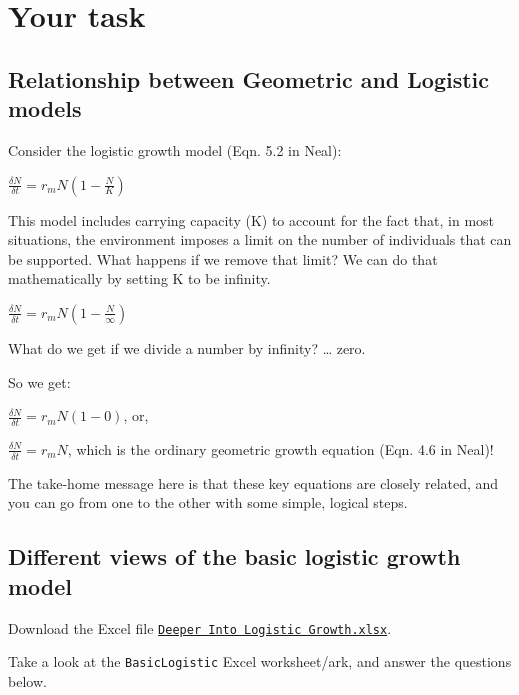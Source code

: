 \documentclass[
  a4paper]{book}
\begin{document}
\hypertarget{your-task-4}{%
\section{Your task}\label{your-task-4}}

\hypertarget{relationship-between-geometric-and-logistic-models}{%
\subsection{Relationship between Geometric and Logistic models}\label{relationship-between-geometric-and-logistic-models}}

Consider the logistic growth model (Eqn. 5.2 in Neal):

\(\frac{\delta N}{\delta t}=r_m N\left(1-\frac{N}{K}\right)\)

This model includes carrying capacity (K) to account for the fact that, in most situations, the environment imposes a limit on the number of individuals that can be supported. What happens if we remove that limit? We can do that mathematically by setting K to be infinity.

\(\frac{\delta N}{\delta t}=r_m N\left(1-\frac{N}{\infty}\right)\)

What do we get if we divide a number by infinity? \ldots{} zero.

So we get:

\(\frac{\delta N}{\delta t}=r_m N\left(1-0\right)\), or,

\(\frac{\delta N}{\delta t}=r_m N\), which is the ordinary geometric growth equation (Eqn. 4.6 in Neal)!

The take-home message here is that these key equations are closely related, and you can go from one to the other with some simple, logical steps.

\hypertarget{different-views-of-the-basic-logistic-growth-model}{%
\subsection{Different views of the basic logistic growth model}\label{different-views-of-the-basic-logistic-growth-model}}

Download the Excel file \href{https://www.dropbox.com/s/4xq399z7skl1akv/Deeper\%20into\%20Logistic\%20Growth.xlsx?dl=1}{\texttt{Deeper\ Into\ Logistic\ Growth.xlsx}}.

Take a look at the \texttt{BasicLogistic} Excel worksheet/ark, and answer the questions below.
\end{document}
